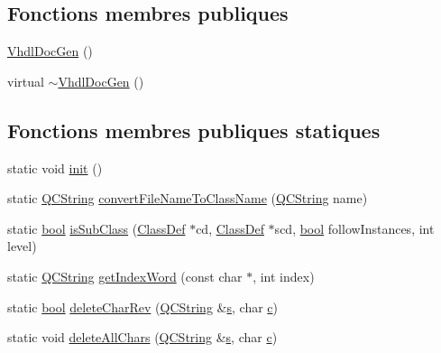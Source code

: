 \subsection*{Fonctions membres publiques}
\begin{DoxyCompactItemize}
\item 
\hyperlink{class_vhdl_doc_gen_a9c81282909ce97e85d0f42a4e2bd3b1e}{Vhdl\+Doc\+Gen} ()
\item 
virtual \hyperlink{class_vhdl_doc_gen_acc05e81acd9943236e3530a0beba9f86}{$\sim$\+Vhdl\+Doc\+Gen} ()
\end{DoxyCompactItemize}
\subsection*{Fonctions membres publiques statiques}
\begin{DoxyCompactItemize}
\item 
static void \hyperlink{class_vhdl_doc_gen_a987fee1e906fac322dda62613525a8f9}{init} ()
\item 
static \hyperlink{class_q_c_string}{Q\+C\+String} \hyperlink{class_vhdl_doc_gen_ac5508320d1d3754b484107c49cfec5a7}{convert\+File\+Name\+To\+Class\+Name} (\hyperlink{class_q_c_string}{Q\+C\+String} name)
\item 
static \hyperlink{qglobal_8h_a1062901a7428fdd9c7f180f5e01ea056}{bool} \hyperlink{class_vhdl_doc_gen_ac7d0f125a2bffca08e8c52644bf8c6f2}{is\+Sub\+Class} (\hyperlink{class_class_def}{Class\+Def} $\ast$cd, \hyperlink{class_class_def}{Class\+Def} $\ast$scd, \hyperlink{qglobal_8h_a1062901a7428fdd9c7f180f5e01ea056}{bool} follow\+Instances, int level)
\item 
static \hyperlink{class_q_c_string}{Q\+C\+String} \hyperlink{class_vhdl_doc_gen_aede8c70a47e630b7a4b562b599304121}{get\+Index\+Word} (const char $\ast$, int index)
\item 
static \hyperlink{qglobal_8h_a1062901a7428fdd9c7f180f5e01ea056}{bool} \hyperlink{class_vhdl_doc_gen_a82a05cf7bd081febd19a0065eed17098}{delete\+Char\+Rev} (\hyperlink{class_q_c_string}{Q\+C\+String} \&\hyperlink{060__command__switch_8tcl_a011c73f2dbb87635a3b4206c72355f6e}{s}, char \hyperlink{060__command__switch_8tcl_ab14f56bc3bd7680490ece4ad7815465f}{c})
\item 
static void \hyperlink{class_vhdl_doc_gen_ae4bf0d0561d8ef807b56c1f29765713e}{delete\+All\+Chars} (\hyperlink{class_q_c_string}{Q\+C\+String} \&\hyperlink{060__command__switch_8tcl_a011c73f2dbb87635a3b4206c72355f6e}{s}, char \hyperlink{060__command__switch_8tcl_ab14f56bc3bd7680490ece4ad7815465f}{c})

\end{DoxyCompactItemize}
